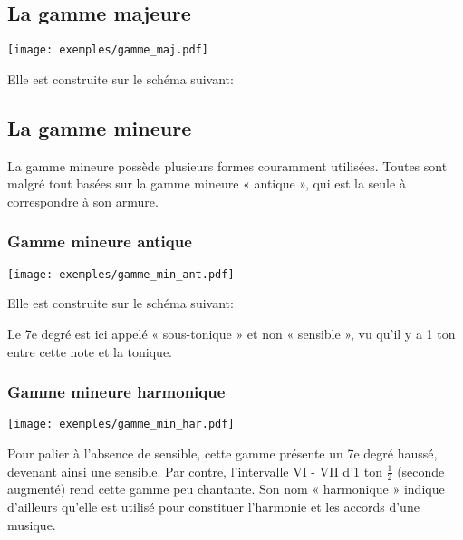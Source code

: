 \documentclass[11pt]{scrreprt}
\begin{document}
\subsection{La gamme majeure}
\begin{center}
  \texttt{[image: exemples/gamme\_maj.pdf]}
\end{center}
Elle est construite sur le schéma suivant: 
\begin{center}
\end{center}


\subsection{La gamme mineure}
La gamme mineure possède plusieurs formes couramment utilisées. Toutes sont malgré tout basées sur la gamme mineure « antique », qui est la seule à correspondre à son armure.

\subsubsection{Gamme mineure antique\label{min_ant}}
\begin{center}
   \texttt{[image: exemples/gamme\_min\_ant.pdf]}
\end{center}

Elle est construite sur le schéma suivant: 
\begin{center}
\end{center}
Le 7e degré est ici appelé « sous-tonique » et non « sensible », vu qu'il y a 1 ton entre cette note et la tonique.

\subsubsection{Gamme mineure harmonique}
\begin{center}
   \texttt{[image: exemples/gamme\_min\_har.pdf]}
\end{center}

Pour palier à l'absence de sensible, cette gamme présente un 7e degré haussé, devenant ainsi une sensible. Par contre, l'intervalle VI - VII d'1 ton $\frac1 2$ (seconde augmenté) rend cette gamme peu chantante. Son nom « harmonique » indique d'ailleurs qu'elle est utilisé pour constituer l'harmonie et les accords d'une musique.
\end{document}
